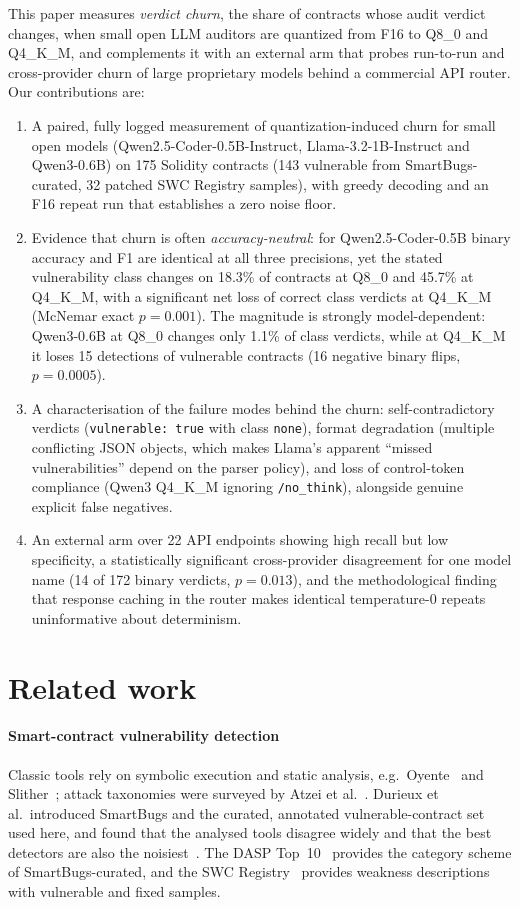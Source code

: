 This paper measures \emph{verdict churn}, the share of contracts whose audit verdict changes, when small open LLM auditors are quantized from F16 to Q8\_0 and Q4\_K\_M, and complements it with an external arm that probes run-to-run and cross-provider churn of large proprietary models behind a commercial API router. Our contributions are:
\begin{enumerate}
\item A paired, fully logged measurement of quantization-induced churn for small open models (Qwen2.5-Coder-0.5B-Instruct, Llama-3.2-1B-Instruct and Qwen3-0.6B) on 175 Solidity contracts (143 vulnerable from SmartBugs-curated, 32 patched SWC Registry samples), with greedy decoding and an F16 repeat run that establishes a zero noise floor.
\item Evidence that churn is often \emph{accuracy-neutral}: for Qwen2.5-Coder-0.5B binary accuracy and F1 are identical at all three precisions, yet the stated vulnerability class changes on 18.3\% of contracts at Q8\_0 and 45.7\% at Q4\_K\_M, with a significant net loss of correct class verdicts at Q4\_K\_M (McNemar exact $p=0.001$). The magnitude is strongly model-dependent: Qwen3-0.6B at Q8\_0 changes only 1.1\% of class verdicts, while at Q4\_K\_M it loses 15 detections of vulnerable contracts (16 negative binary flips, $p=0.0005$).
\item A characterisation of the failure modes behind the churn: self-contradictory verdicts (\texttt{vulnerable: true} with class \texttt{none}), format degradation (multiple conflicting JSON objects, which makes Llama's apparent ``missed vulnerabilities'' depend on the parser policy), and loss of control-token compliance (Qwen3 Q4\_K\_M ignoring \texttt{/no\_think}), alongside genuine explicit false negatives.
\item An external arm over 22 API endpoints showing high recall but low specificity, a statistically significant cross-provider disagreement for one model name (14 of 172 binary verdicts, $p=0.013$), and the methodological finding that response caching in the router makes identical temperature-0 repeats uninformative about determinism.
\end{enumerate}

\section{Related work}\label{sec:related}
\paragraph{Smart-contract vulnerability detection}
Classic tools rely on symbolic execution and static analysis, e.g.\ Oyente~\cite{luu2016making} and Slither~\cite{feist2019slither}; attack taxonomies were surveyed by Atzei et al.~\cite{atzei2017survey}. Durieux et al.\ introduced SmartBugs and the curated, annotated vulnerable-contract set used here, and found that the analysed tools disagree widely and that the best detectors are also the noisiest~\cite{durieux2020empirical,ferreira2020smartbugs}. The DASP Top~10~\cite{dasp2018} provides the category scheme of SmartBugs-curated, and the SWC Registry~\cite{swcregistry} provides weakness descriptions with vulnerable and fixed samples.

